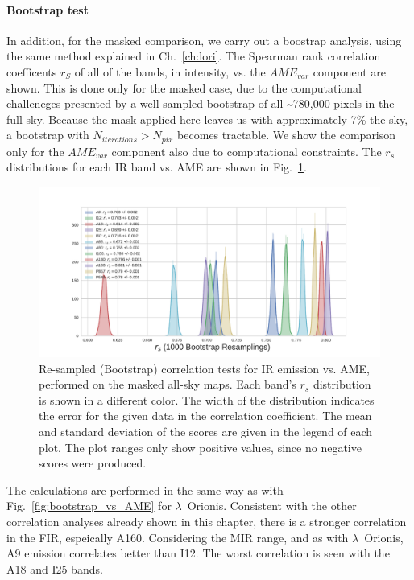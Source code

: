          \paragraph{Bootstrap test}
              In addition, for the masked comparison, we carry out a boostrap analysis, using the same method explained in Ch.~\ref{ch:lori}. The Spearman rank correlation coefficents $r_{S}$ of all of the bands, in intensity, vs. the $AME_{var}$ component are shown. This is done only for the masked case, due to the computational challeneges presented by a well-sampled bootstrap of all \textasciitilde{}780,000 pixels in the full sky. Because the mask applied here leaves us with approximately 7\% the sky, a bootstrap with $N_{iterations} > N_{pix}$ becomes tractable. We show the comparison only for the $AME_{var}$ component also due to computational constraints. The $r_{s}$ distributions for each IR band vs. AME are shown in Fig.~\ref{fig:bootstrap_vs_AME_allsky_masked}.
                \begin{figure}
                     \includegraphics[width=\textwidth,trim={3cm 0.25cm 2.5cm 1cm},clip]{../Plots/ch_allsky/bootstrap_vs_AME_spearman_maskall_i1000.pdf}
                     \centering
                     \caption{Re-sampled (Bootstrap) correlation tests for IR emission vs. AME, performed on the masked all-sky maps. Each band's $r_{s}$ distribution is shown in a different color. The width of the distribution indicates the error for the given data in the correlation coefficient. The mean and standard deviation of the scores are given in the legend of each plot. The plot ranges only show positive values, since no negative scores were produced. }
                     \label{fig:bootstrap_vs_AME_allsky_masked}
                \end{figure}
            The calculations are performed in the same way as with Fig.~\ref{fig:bootstrap_vs_AME} for $\lambda$~Orionis. Consistent with the other correlation analyses already shown in this chapter, there is a stronger correlation in the FIR, espeically A160. Considering the MIR range, and as with $\lambda$~Orionis, A9 emission correlates better than I12. The worst correlation is seen with the A18 and I25 bands.

